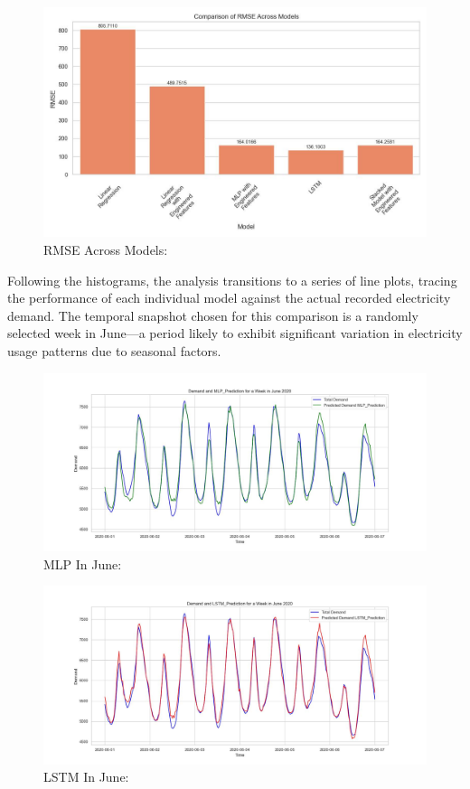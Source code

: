 \documentclass[mstat,12pt]{unswthesis}
\begin{document}
\begin{figure}
\centering
\includegraphics{img/rmse_comparison_across_models.jpg}
\caption{RMSE Across Models:}
\end{figure}

Following the histograms, the analysis transitions to a series of line
plots, tracing the performance of each individual model against the
actual recorded electricity demand. The temporal snapshot chosen for
this comparison is a randomly selected week in June---a period likely to
exhibit significant variation in electricity usage patterns due to
seasonal factors.

\begin{figure}
\centering
\includegraphics{img/mlp-prediction_june_2020.jpg}
\caption{MLP In June:}
\end{figure}

\begin{figure}
\centering
\includegraphics{img/lstm-prediction_june_2020.jpg}
\caption{LSTM In June:}
\end{figure}
\end{document}
